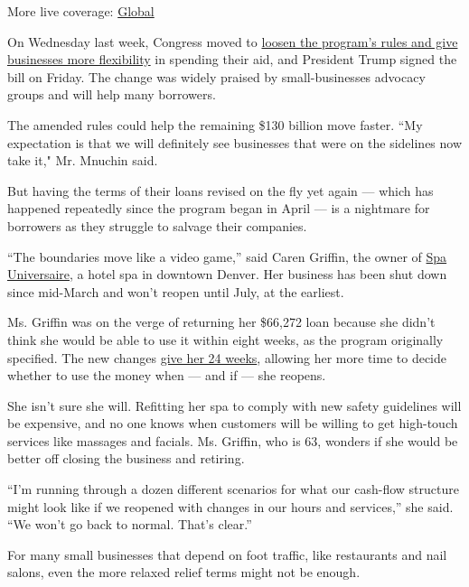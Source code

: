 More live coverage:
\href{https://www.nytimes.com/2020/08/04/world/coronavirus-covid-19.html?action=click\&pgtype=Article\&state=default\&region=MAIN_CONTENT_1\&context=storylines_live_updates}{Global}

On Wednesday last week, Congress moved to
\href{https://www.nytimes.com/2020/06/03/business/stock-market-today-coronavirus.html\#link-7a1554a7}{loosen
the program's rules and give businesses more flexibility} in spending
their aid, and President Trump signed the bill on Friday. The change was
widely praised by small-businesses advocacy groups and will help many
borrowers.

The amended rules could help the remaining \$130 billion move faster.
``My expectation is that we will definitely see businesses that were on
the sidelines now take it," Mr. Mnuchin said.

But having the terms of their loans revised on the fly yet again ---
which has happened repeatedly since the program began in April --- is a
nightmare for borrowers as they struggle to salvage their companies.

``The boundaries move like a video game,'' said Caren Griffin, the owner
of \href{https://spauniversaire.com/}{Spa Universaire}, a hotel spa in
downtown Denver. Her business has been shut down since mid-March and
won't reopen until July, at the earliest.

Ms. Griffin was on the verge of returning her \$66,272 loan because she
didn't think she would be able to use it within eight weeks, as the
program originally specified. The new changes
\href{https://www.jdsupra.com/legalnews/congress-adds-more-flexibility-to-71347/}{give
her 24 weeks}, allowing her more time to decide whether to use the money
when --- and if --- she reopens.

She isn't sure she will. Refitting her spa to comply with new safety
guidelines will be expensive, and no one knows when customers will be
willing to get high-touch services like massages and facials. Ms.
Griffin, who is 63, wonders if she would be better off closing the
business and retiring.

``I'm running through a dozen different scenarios for what our cash-flow
structure might look like if we reopened with changes in our hours and
services,'' she said. ``We won't go back to normal. That's clear.''

For many small businesses that depend on foot traffic, like restaurants
and nail salons, even the more relaxed relief terms might not be enough.

